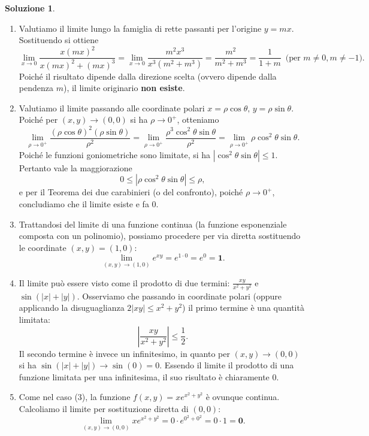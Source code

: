 \documentclass[12pt,a4paper]{article}
\theoremstyle{definition}
\newtheorem{sol}{Soluzione}
\begin{document}
\begin{sol}
    \begin{enumerate}
        \item Valutiamo il limite lungo la famiglia di rette passanti per l'origine $y = mx$. Sostituendo si ottiene
              \[ \lim_{x \to 0} \frac{x(mx)^2}{x(mx)^2 + (mx)^3} = \lim_{x \to 0} \frac{m^2 x^3}{x^3(m^2 + m^3)} = \frac{m^2}{m^2+m^3} = \frac{1}{1+m} \, \text{ (per } m \ne 0, m \ne -1). \]
              Poiché il risultato dipende dalla direzione scelta (ovvero dipende dalla pendenza $m$), il limite originario \textbf{non esiste}.
        \item Valutiamo il limite passando alle coordinate polari $x = \rho \cos \theta, \, y = \rho \sin \theta$. Poiché per $(x,y) \to (0,0)$ si ha $\rho \to 0^+$, otteniamo
              \[ \lim_{\rho \to 0^+} \frac{(\rho \cos \theta)^2 (\rho \sin \theta)}{\rho^2} = \lim_{\rho \to 0^+} \frac{\rho^3 \cos^2 \theta \sin \theta}{\rho^2} = \lim_{\rho \to 0^+} \rho \cos^2 \theta \sin \theta. \]
              Poiché le funzioni goniometriche sono limitate, si ha $|\cos^2 \theta \sin \theta| \le 1$. Pertanto vale la maggiorazione
              \[ 0 \le |\rho \cos^2 \theta \sin \theta| \le \rho, \]
              e per il Teorema dei due carabinieri (o del confronto), poiché $\rho \to 0^+$, concludiamo che il limite esiste e fa \textbf{$0$}.
        \item Trattandosi del limite di una funzione continua (la funzione esponenziale composta con un polinomio), possiamo procedere per via diretta sostituendo le coordinate $(x,y) = (1,0)$:
              \[ \lim_{(x,y) \to (1,0)} e^{xy} = e^{1 \cdot 0} = e^0 = \mathbf{1}. \]
        \item Il limite può essere visto come il prodotto di due termini: $\frac{xy}{x^2+y^2}$ e $\sin(|x|+|y|)$. Osserviamo che passando in coordinate polari (oppure applicando la disuguaglianza $2|xy| \le x^2+y^2$) il primo termine è una quantità limitata:
              \[ \left| \frac{xy}{x^2+y^2} \right| \le \frac{1}{2}. \]
              Il secondo termine è invece un infinitesimo, in quanto per $(x,y) \to (0,0)$ si ha $\sin(|x|+|y|) \to \sin(0) = 0$. Essendo il limite il prodotto di una funzione limitata per una infinitesima, il suo risultato è chiaramente \textbf{$0$}.
        \item Come nel caso (3), la funzione $f(x,y) = x e^{x^2+y^2}$ è ovunque continua. Calcoliamo il limite per sostituzione diretta di $(0,0)$:
              \[ \lim_{(x,y) \to (0,0)} x e^{x^2+y^2} = 0 \cdot e^{0^2+0^2} = 0 \cdot 1 = \mathbf{0}. \]
    \end{enumerate}
\end{sol}
\end{document}
